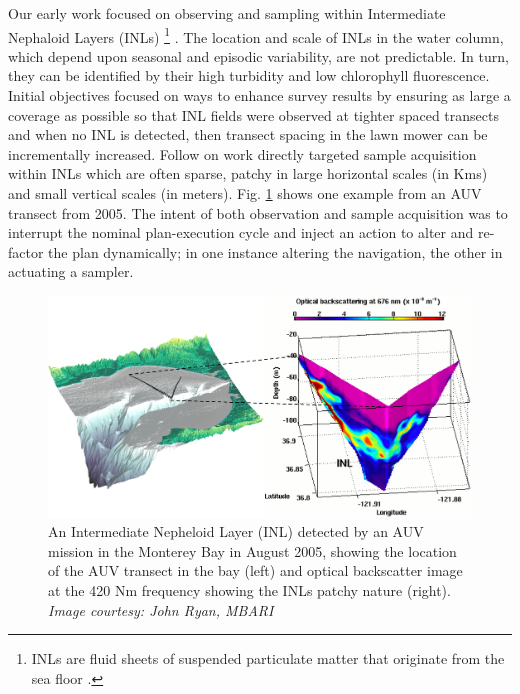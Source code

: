Our early work focused on observing and sampling within Intermediate
Nephaloid Layers (INLs) \footnote{INLs are fluid sheets of suspended
  particulate matter that originate from the sea floor
  \cite{mcphee-shaw2006}.} \cite{ryan10}. The location and scale of
INLs in the water column, which depend upon seasonal and episodic
variability, are not predictable. In turn, they can be identified by
their high turbidity and low chlorophyll fluorescence. Initial
objectives focused on ways to enhance survey results by ensuring as
large a coverage as possible so that INL fields were observed at
tighter spaced transects and when no INL is detected, then transect
spacing in the lawn mower can be incrementally increased. Follow on
work directly targeted sample acquisition within INLs which are often
sparse, patchy in large horizontal scales (in Kms) and small vertical
scales (in meters). Fig. \ref{fig:inl} shows one example from an AUV
transect from 2005. The intent of both observation and sample
acquisition was to interrupt the nominal plan-execution cycle and
inject an action to alter and re-factor the plan dynamically; in one
instance altering the navigation, the other in actuating a sampler.

\begin{figure}[b]
\centering
\includegraphics[scale=0.65]{figs/inl.jpg}
\caption{\small An Intermediate Nepheloid Layer (INL) detected by an
  AUV mission in the Monterey Bay in August 2005, showing the location
  of the AUV transect in the bay (left) and optical backscatter image
  at the 420 Nm frequency showing the INLs patchy nature
  (right). \emph{Image courtesy: John Ryan, MBARI}}
\label{fig:inl}
\end{figure}


